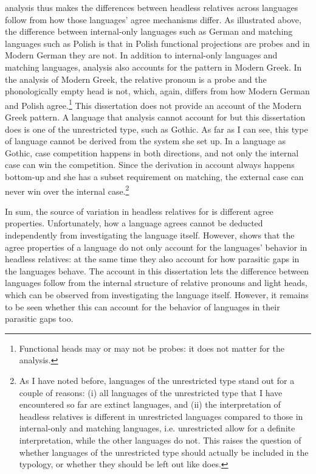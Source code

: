  analysis thus makes the differences between headless relatives across languages follow from how those languages' agree mechanisms differ. As illustrated above, the difference between internal-only languages such as German and matching languages such as Polish is that in Polish functional projections are probes and in Modern German they are not. In addition to internal-only languages and matching languages,  analysis also accounts for the pattern in Modern Greek. In the analysis of Modern Greek, the relative pronoun is a probe and the phonologically empty head is not, which, again, differs from how Modern German and Polish agree.\footnote{
Functional heads may or may not be probes: it does not matter for the analysis.} 
This dissertation does not provide an account of the Modern Greek pattern.
A language that  analysis cannot account for but this dissertation does is one of the unrestricted type, such as Gothic. As far as I can see, this type of language cannot be derived from the system she set up. In a language as Gothic, case competition happens in both directions, and not only the internal case can win the competition. Since the derivation in  account always happens bottom-up and she has a subset requirement on matching, the external case can never win over the internal case.\footnote{
As I have noted before, languages of the unrestricted type stand out for a couple of reasons: (i) all languages of the unrestricted type that I have encountered so far are extinct languages, and (ii) the interpretation of headless relatives is different in unrestricted languages compared to those in internal-only and matching languages, i.e. unrestricted allow for a definite interpretation, while the other languages do not. This raises the question of whether languages of the unrestricted type should actually be included in the typology, or whether they should be left out like \citet{himmelreich2017} does. 
}

In sum, the source of variation in headless relatives for \citet{himmelreich2017} is different agree properties. Unfortunately, how a language agrees cannot be deducted independently from investigating the language itself. However, \citet{himmelreich2017} shows that the agree properties of a language do not only account for the languages' behavior in headless relatives: at the same time they also account for how parasitic gaps in the languages behave.
The account in this dissertation lets the difference between languages follow from the internal structure of relative pronouns and light heads, which can be observed from investigating the language itself. However, it remains to be seen whether this can account for the behavior of languages in their parasitic gaps too.



